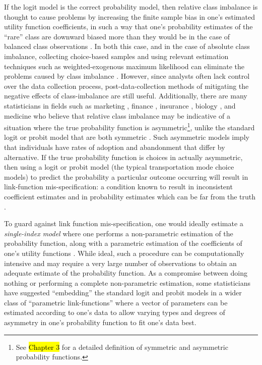 \documentclass{article}
\begin{document}
If the logit model is the correct probability model, then relative class imbalance is thought to cause problems by increasing the finite sample bias in one's estimated utility function coefficients, in such a way that one's probability estimates of the ``rare'' class are downward biased more than they would be in the case of balanced class observations \citep{king_logistic_2001}. In both this case, and in the case of absolute class imbalance, collecting choice-based samples and using relevant estimation techniques such as weighted-exogenous maximum likelihood can eliminate the problems caused by class imbalance \citep{manski_estimation_1977, breslow_statistical_1987, king_logistic_2001}. However, since analysts often lack control over the data collection process, post-data-collection methods of mitigating the negative effects of class-imbalance are still useful. Additionally, there are many statisticians in fields such as marketing \citep{wang_generalized_2010}, finance \citep{calabrese_generalized_2011}, insurance \citep{bermudez_bayesian_2008, perez-sanchez_bayesian_2014}, biology \citep{jiang_new_2013}, and medicine \citep{saez-castillo_bayesian_2010} who believe that relative class imbalance may be indicative of a situation where the true probability function is asymmetric\footnote{See \hl{Chapter 3} for a detailed definition of symmetric and asymmetric probability functions.}, unlike the standard logit or probit model that are both symmetric \citep{chen_new_1999}. Such asymmetric models imply that individuals have rates of adoption and abandonment that differ by alternative. If the true probability function is choices in actually asymmetric, then using a logit or probit model (the typical transportation mode choice models) to predict the probability a particular outcome occurring will result in link-function mis-specification: a condition known to result in inconsistent coefficient estimates \citep{czado_effect_1992} and in probability estimates which can be far from the truth \citep{koenker_parametric_2009}. 

To guard against link function mis-specification, one would ideally estimate a \textit{single-index model} where one performs a non-parametric estimation of the probability function, along with a parametric estimation of the coefficients of one's utility functions \citep{hardle_semiparametric_1997, horowitz_semiparametric_2010}. While ideal, such a procedure can be computationally intensive and may require a very large number of observations to obtain an adequate estimate of the probability function. As a compromise between doing nothing or performing a complete non-parametric estimation, some statisticians \citep{czado_parametric_1994, koenker_parametric_2009} have suggested ``embedding'' the standard logit and probit models in a wider class of ``parametric link-functions'' where a vector of parameters can be estimated according to one's data to allow varying types and degrees of asymmetry in one's probability function to fit one's data best.
\end{document}
